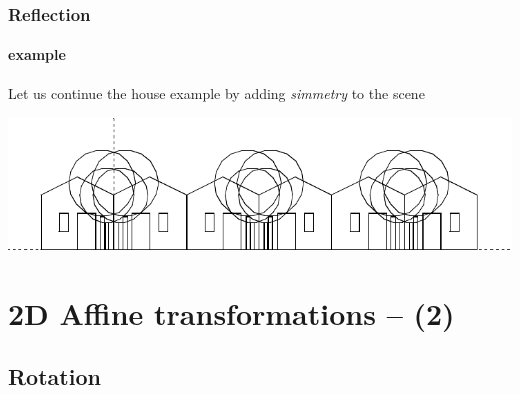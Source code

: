 \documentclass{beamer}
\begin{document}
\begin{frame}[fragile]
\frametitle{Reflection}
\framesubtitle{example}\small

Let us continue the house example by adding \emph{simmetry} to the scene
\vfill

\includegraphics[width=\linewidth]{images/mirror}

\vfill


\end{frame}
\section{2D Affine transformations -- (2)}

\subsection{Rotation}
\end{document}
